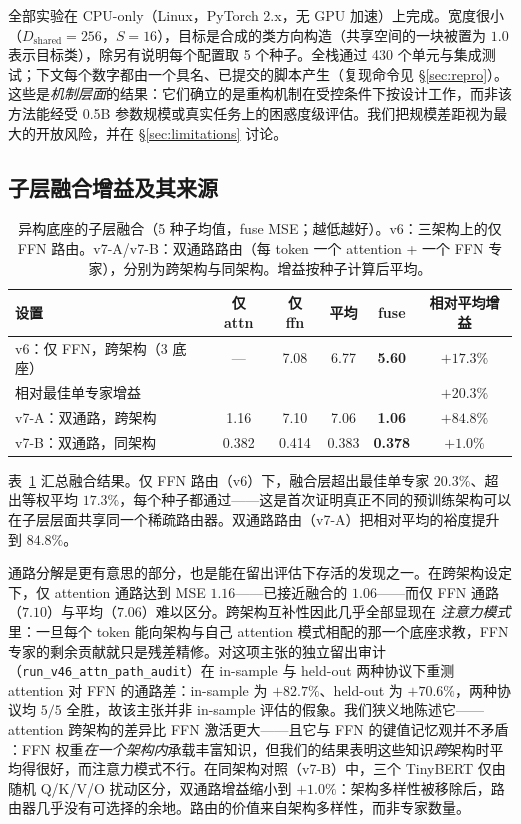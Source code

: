 \documentclass[10pt,twoside]{article}
\theoremstyle{definition}
\theoremstyle{plain}
\theoremstyle{remark}
\begin{document}
全部实验在 CPU-only（Linux，PyTorch 2.x，无 GPU 加速）上完成。宽度很小（$D_{\text{shared}}{=}256$，$S{=}16$），目标是合成的类方向构造（共享空间的一块被置为 $1.0$ 表示目标类），除另有说明每个配置取 5 个种子。全栈通过 430 个单元与集成测试；下文每个数字都由一个具名、已提交的脚本产生（复现命令见 \S\ref{sec:repro}）。这些是\emph{机制层面}的结果：它们确立的是重构机制在受控条件下按设计工作，而非该方法能经受 0.5B 参数规模或真实任务上的困惑度级评估。我们把规模差距视为最大的开放风险，并在 \S\ref{sec:limitations} 讨论。

\subsection{子层融合增益及其来源}
\label{sec:fusion-exp}

\begin{table}[htbp]
\centering
\caption{异构底座的子层融合（5 种子均值，fuse MSE；越低越好）。v6：三架构上的仅 FFN 路由。v7-A/v7-B：双通路路由（每 token 一个 attention + 一个 FFN 专家），分别为跨架构与同架构。增益按种子计算后平均。}
\label{tab:fusion}
\small
\setlength{\tabcolsep}{4.5pt}
\begin{tabular}{lccccc}
\toprule
\textbf{设置} & \textbf{仅 attn} & \textbf{仅 ffn} & \textbf{平均} & \textbf{fuse} & \textbf{相对平均增益} \\
\midrule
v6：仅 FFN，跨架构（3 底座） & --- & 7.08 & 6.77 & \textbf{5.60} & $+17.3\%$ \\
\quad 相对最佳单专家增益 & & & & & $+20.3\%$ \\
v7-A：双通路，跨架构 & 1.16 & 7.10 & 7.06 & \textbf{1.06} & $+84.8\%$ \\
v7-B：双通路，同架构 & 0.382 & 0.414 & 0.383 & \textbf{0.378} & $+1.0\%$ \\
\bottomrule
\end{tabular}
\end{table}

表~\ref{tab:fusion} 汇总融合结果。仅 FFN 路由（v6）下，融合层超出最佳单专家 $20.3\%$、超出等权平均 $17.3\%$，每个种子都通过——这是首次证明真正不同的预训练架构可以在子层层面共享同一个稀疏路由器。双通路路由（v7-A）把相对平均的裕度提升到 $84.8\%$。

通路分解是更有意思的部分，也是能在留出评估下存活的发现之一。在跨架构设定下，仅 attention 通路达到 MSE $1.16$——已接近融合的 $1.06$——而仅 FFN 通路（$7.10$）与平均（$7.06$）难以区分。跨架构互补性因此几乎全部显现在 \emph{注意力模式}里：一旦每个 token 能向架构与自己 attention 模式相配的那一个底座求教，FFN 专家的剩余贡献就只是残差精修。对这项主张的独立留出审计（\texttt{run\_v46\_attn\_path\_audit}）在 in-sample 与 held-out 两种协议下重测 attention 对 FFN 的通路差：in-sample 为 $+82.7\%$、held-out 为 $+70.6\%$，两种协议均 $5/5$ 全胜，故该主张并非 in-sample 评估的假象。我们狭义地陈述它——attention 跨架构的差异比 FFN 激活更大——且它与 FFN 的键值记忆观并不矛盾 \citep{geva2021,meng2022,dai2022}：FFN 权重\emph{在一个架构内}承载丰富知识，但我们的结果表明这些知识\emph{跨}架构时平均得很好，而注意力模式不行。在同架构对照（v7-B）中，三个 TinyBERT 仅由随机 Q/K/V/O 扰动区分，双通路增益缩小到 $+1.0\%$：架构多样性被移除后，路由器几乎没有可选择的余地。路由的价值来自架构多样性，而非专家数量。
\end{document}
